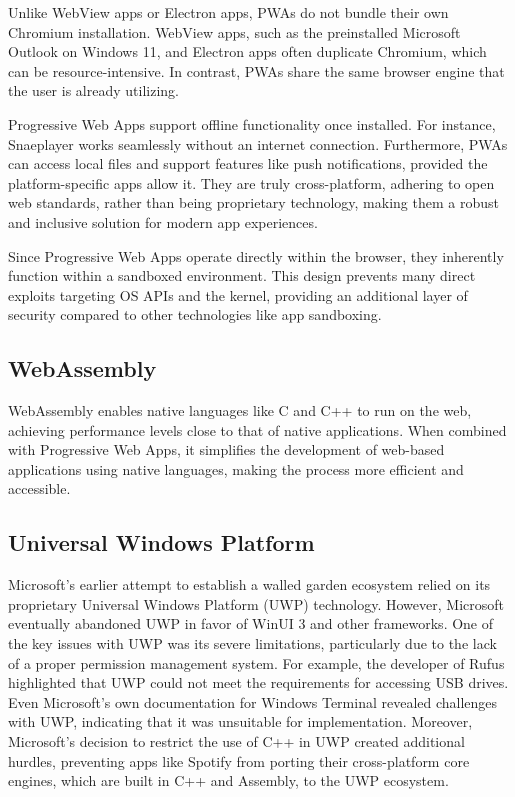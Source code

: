 Unlike WebView apps or Electron apps, PWAs do not bundle their own Chromium installation. WebView apps, such as the preinstalled Microsoft Outlook on Windows 11, and Electron apps often duplicate Chromium, which can be resource-intensive. In contrast, PWAs share the same browser engine that the user is already utilizing.

Progressive Web Apps support offline functionality once installed. For instance, Snaeplayer works seamlessly without an internet connection. Furthermore, PWAs can access local files and support features like push notifications, provided the platform-specific apps allow it. They are truly cross-platform, adhering to open web standards, rather than being proprietary technology, making them a robust and inclusive solution for modern app experiences.

Since Progressive Web Apps operate directly within the browser, they inherently function within a sandboxed environment. This design prevents many direct exploits targeting OS APIs and the kernel, providing an additional layer of security compared to other technologies like app sandboxing.

\subsection{WebAssembly}

WebAssembly\cite{WebAssembly2025, 10.1145/3140587.3062363} enables native languages like C and C++ to run on the web, achieving performance levels close to that of native applications. When combined with Progressive Web Apps, it simplifies the development of web-based applications using native languages, making the process more efficient and accessible.

\subsection{Universal Windows Platform}

Microsoft's earlier attempt to establish a walled garden ecosystem relied on its proprietary Universal Windows Platform (UWP) technology. However, Microsoft eventually abandoned UWP in favor of WinUI 3 and other frameworks. One of the key issues with UWP was its severe limitations, particularly due to the lack of a proper permission management system. For example, the developer of Rufus highlighted that UWP could not meet the requirements for accessing USB drives\cite{githubRufusUWP}. Even Microsoft's own documentation for Windows Terminal revealed challenges with UWP, indicating that it was unsuitable for implementation. Moreover, Microsoft's decision to restrict the use of C++ in UWP created additional hurdles, preventing apps like Spotify from porting their cross-platform core engines, which are built in C++ and Assembly, to the UWP ecosystem\cite{microsoftBannedCPlusPlus}.

